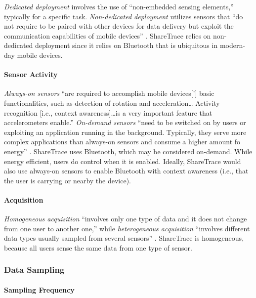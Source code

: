 \emph{Dedicated deployment} involves the use of ``non-embedded sensing elements,'' typically for a specific task. \emph{Non-dedicated deployment} utilizes sensors that ``do not require to be paired with other devices for data delivery but exploit the communication capabilities of mobile devices'' \cite{Capponi2019}. ShareTrace relies on non-dedicated deployment since it relies on Bluetooth that is ubiquitous in modern-day mobile devices.

\paragraph{Sensor Activity}

\emph{Always-on sensors} ``are required to accomplish mobile devices['] basic functionalities, such as detection of rotation and acceleration{\ldots} Activity recognition [i.e., context awareness]{\ldots}is a very important feature that accelerometers enable.'' \emph{On-demand sensors} ``need to be switched on by users or exploiting an application running in the background. Typically, they serve more complex applications than always-on sensors and consume a higher amount fo energy'' \cite{Capponi2019}. ShareTrace uses Bluetooth, which may be considered on-demand. While energy efficient, users do control when it is enabled. Ideally, ShareTrace would also use always-on sensors to enable Bluetooth with context awareness (i.e., that the user is carrying or nearby the device).

\paragraph{Acquisition}

\emph{Homogeneous acquisition} ``involves only one type of data and it does not change from one user to another one,'' while \emph{heterogeneous acquisition} ``involves different data types usually sampled from several sensors'' \cite{Capponi2019}. ShareTrace is homogeneous, because all users sense the same data from one type of sensor.

\subsubsection{Data Sampling}

\paragraph{Sampling Frequency}

